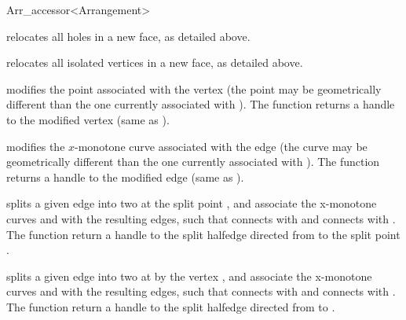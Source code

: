 \begin{ccRefClass}{Arr_accessor<Arrangement>}
\begin{ccAdvanced}
    {relocates all holes in a new face, as detailed above.}

    {relocates all isolated vertices in a new face, as detailed above.}

    {modifies the point associated with the vertex  (the point may be
     geometrically different than the one currently associated with ).
     The function returns a handle to the modified vertex (same as ).
     }

    {modifies the $x$-monotone curve associated with the edge  (the
     curve  may be geometrically different than the one currently
     associated with ).
     The function returns a handle to the modified edge (same as ).
     }
 
    {splits a given edge into two at the split point , and associate the
     x-monotone curves  and  with the resulting edges, such that
      connects  with  and  connects 
      with . The function return a handle to the split 
     halfedge directed from  to the split point .
     }

    {splits a given edge into two at by the vertex , and associate the
     x-monotone curves  and  with the resulting edges, such that
      connects  with  and  connects 
      with . The function return a handle to the split 
     halfedge directed from  to .
     }


\end{ccAdvanced}
\end{ccRefClass}

